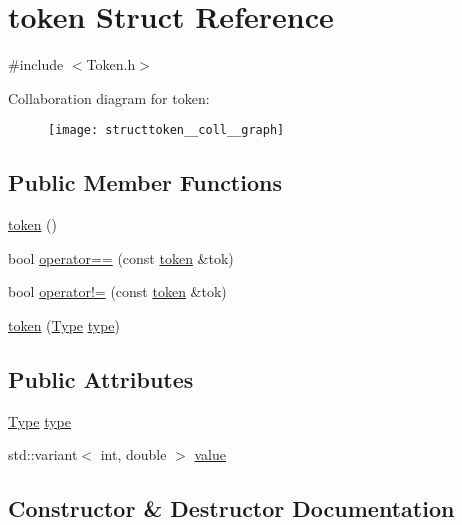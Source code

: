 \hypertarget{structtoken}{}\section{token Struct Reference}
\label{structtoken}


{\ttfamily \#include $<$Token.\+h$>$}



Collaboration diagram for token\+:
\nopagebreak
\begin{figure}[H]
\begin{center}
\leavevmode
\texttt{[image: structtoken\_\_coll\_\_graph]}
\end{center}
\end{figure}
\subsection*{Public Member Functions}
\begin{DoxyCompactItemize}
\item 
\mbox{\hyperlink{structtoken_a91d47c8b276e40caa47e2fe678135417}{token}} ()
\item 
bool \mbox{\hyperlink{structtoken_a04fcf43dceb55d44e5d940c32e484459}{operator==}} (const \mbox{\hyperlink{structtoken}{token}} \&tok)
\item 
bool \mbox{\hyperlink{structtoken_a9aebe580288a11656d556f46810b3ca3}{operator!=}} (const \mbox{\hyperlink{structtoken}{token}} \&tok)
\item 
\mbox{\hyperlink{structtoken_a40048af660a108bc9c12ead64c0db095}{token}} (\mbox{\hyperlink{_token_8h_a1d1cfd8ffb84e947f82999c682b666a7}{Type}} \mbox{\hyperlink{structtoken_a5095946f8d629ebd52196764398077d7}{type}})
\end{DoxyCompactItemize}
\subsection*{Public Attributes}
\begin{DoxyCompactItemize}
\item 
\mbox{\hyperlink{_token_8h_a1d1cfd8ffb84e947f82999c682b666a7}{Type}} \mbox{\hyperlink{structtoken_a5095946f8d629ebd52196764398077d7}{type}}
\item 
std\+::variant$<$ int, double $>$ \mbox{\hyperlink{structtoken_a669995ca95f73ac9fdee2e5353158dfb}{value}}
\end{DoxyCompactItemize}


\subsection{Constructor \& Destructor Documentation}
\mbox{\label{structtoken_a91d47c8b276e40caa47e2fe678135417}} 
